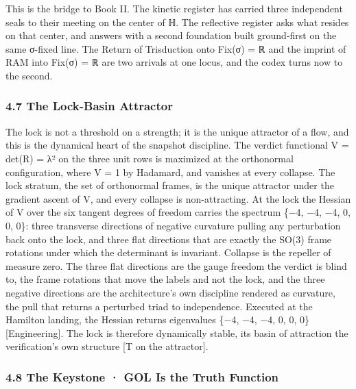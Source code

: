\documentclass[10pt,twocolumn]{article}
\begin{document}
This is the bridge to Book II. The kinetic register has carried three
independent seals to their meeting on the center of ℍ. The reflective
register asks what resides on that center, and answers with a second
foundation built ground-first on the same σ-fixed line. The Return of
Trisduction onto Fix(σ) = ℝ and the imprint of RAM into Fix(σ) = ℝ are
two arrivals at one locus, and the codex turns now to the second.

\hypertarget{the-lock-basin-attractor}{%
\subsubsection{4.7 The Lock-Basin
Attractor}\label{the-lock-basin-attractor}}

The lock is not a threshold on a strength; it is the unique attractor of
a flow, and this is the dynamical heart of the snapshot discipline. The
verdict functional V = det(R) = λ² on the three unit rows is maximized
at the orthonormal configuration, where V = 1 by Hadamard, and vanishes
at every collapse. The lock stratum, the set of orthonormal frames, is
the unique attractor under the gradient ascent of V, and every collapse
is non-attracting. At the lock the Hessian of V over the six tangent
degrees of freedom carries the spectrum \{−4, −4, −4, 0, 0, 0\}: three
transverse directions of negative curvature pulling any perturbation
back onto the lock, and three flat directions that are exactly the SO(3)
frame rotations under which the determinant is invariant. Collapse is
the repeller of measure zero. The three flat directions are the gauge
freedom the verdict is blind to, the frame rotations that move the
labels and not the lock, and the three negative directions are the
architecture's own discipline rendered as curvature, the pull that
returns a perturbed triad to independence. Executed at the Hamilton
landing, the Hessian returns eigenvalues \{−4, −4, −4, 0, 0, 0\}
{[}Engineering{]}. The lock is therefore dynamically stable, its basin
of attraction the verification's own structure {[}T on the attractor{]}.

\hypertarget{the-keystone-gol-is-the-truth-function}{%
\subsubsection{4.8 The Keystone · GOL Is the Truth
Function}\label{the-keystone-gol-is-the-truth-function}}
\end{document}

